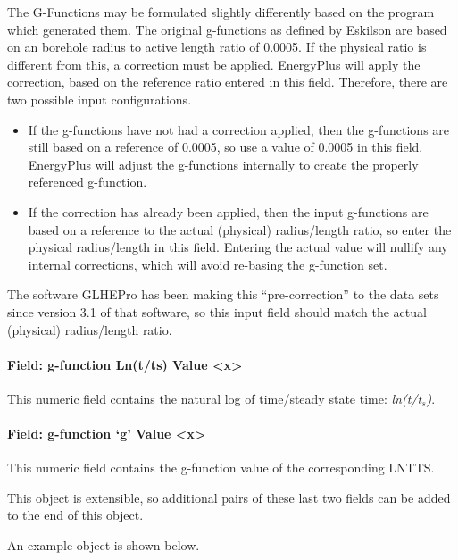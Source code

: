 The G-Functions may be formulated slightly differently based on the program which generated them. The original g-functions as defined by Eskilson are based on an borehole radius to active length ratio of 0.0005. If the physical ratio is different from this, a correction must be applied. EnergyPlus will apply the correction, based on the reference ratio entered in this field. Therefore, there are two possible input configurations.

\begin{itemize}
\item
  If the g-functions have not had a correction applied, then the g-functions are still based on a reference of 0.0005, so use a value of 0.0005 in this field. EnergyPlus will adjust the g-functions internally to create the properly referenced g-function.
\item
  If the correction has already been applied, then the input g-functions are based on a reference to the actual (physical) radius/length ratio, so enter the physical radius/length in this field. Entering the actual value will nullify any internal corrections, which will avoid re-basing the g-function set.
\end{itemize}

The software GLHEPro has been making this ``pre-correction'' to the data sets since version 3.1 of that software, so this input field should match the actual (physical) radius/length ratio.

\paragraph{Field: g-function Ln(t/ts) Value \textless{}x\textgreater{}}\label{field-g-function-lntts-value-x}

This numeric field contains the natural log of time/steady state time: \emph{ln(t/t\(_{s}\))}.

\paragraph{Field: g-function `g' Value \textless{}x\textgreater{}}\label{field-g-function-g-value-x}

This numeric field contains the g-function value of the corresponding LNTTS.

This object is extensible, so additional pairs of these last two fields can be added to the end of this object.

An example object is shown below.

